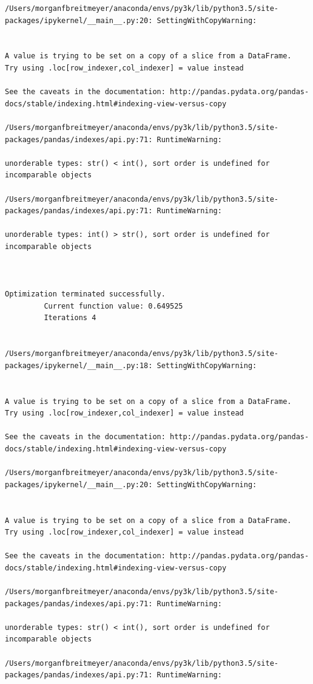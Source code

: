 \begin{lstlisting}
/Users/morganfbreitmeyer/anaconda/envs/py3k/lib/python3.5/site-packages/ipykernel/__main__.py:20: SettingWithCopyWarning:


A value is trying to be set on a copy of a slice from a DataFrame.
Try using .loc[row_indexer,col_indexer] = value instead

See the caveats in the documentation: http://pandas.pydata.org/pandas-docs/stable/indexing.html#indexing-view-versus-copy

/Users/morganfbreitmeyer/anaconda/envs/py3k/lib/python3.5/site-packages/pandas/indexes/api.py:71: RuntimeWarning:

unorderable types: str() < int(), sort order is undefined for incomparable objects

/Users/morganfbreitmeyer/anaconda/envs/py3k/lib/python3.5/site-packages/pandas/indexes/api.py:71: RuntimeWarning:

unorderable types: int() > str(), sort order is undefined for incomparable objects



Optimization terminated successfully.
         Current function value: 0.649525
         Iterations 4


/Users/morganfbreitmeyer/anaconda/envs/py3k/lib/python3.5/site-packages/ipykernel/__main__.py:18: SettingWithCopyWarning:


A value is trying to be set on a copy of a slice from a DataFrame.
Try using .loc[row_indexer,col_indexer] = value instead

See the caveats in the documentation: http://pandas.pydata.org/pandas-docs/stable/indexing.html#indexing-view-versus-copy

/Users/morganfbreitmeyer/anaconda/envs/py3k/lib/python3.5/site-packages/ipykernel/__main__.py:20: SettingWithCopyWarning:


A value is trying to be set on a copy of a slice from a DataFrame.
Try using .loc[row_indexer,col_indexer] = value instead

See the caveats in the documentation: http://pandas.pydata.org/pandas-docs/stable/indexing.html#indexing-view-versus-copy

/Users/morganfbreitmeyer/anaconda/envs/py3k/lib/python3.5/site-packages/pandas/indexes/api.py:71: RuntimeWarning:

unorderable types: str() < int(), sort order is undefined for incomparable objects

/Users/morganfbreitmeyer/anaconda/envs/py3k/lib/python3.5/site-packages/pandas/indexes/api.py:71: RuntimeWarning:


\end{lstlisting}
